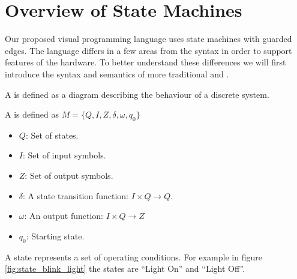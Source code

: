 \section{Overview of State Machines} \label{sec:overviewstatechart}

Our proposed visual programming language uses state machines with guarded edges. The language differs in a few areas from the  \cite{UML2} syntax in order to support features of the hardware. To better understand these differences we will first introduce the syntax and semantics of more traditional \cite{booth} and \cite{UML2}.

A \cite{booth} is defined as a diagram describing the behaviour of a discrete system.

\begin{definition}
A  is defined as $M = \lbrace Q, I, Z, \delta, \omega, q_0\rbrace$

\label{def:statecharts}
\begin{itemize}
	\item $Q$: Set of states.
	\item $I$: Set of input symbols.
	\item $Z$: Set of output symbols.
	\item $\delta$: A state transition function: $I \times Q \rightarrow Q$. 
	\item $\omega$: An output function: $I \times Q \rightarrow Z$
	\item $q_0$: Starting state.
\end{itemize}
\end{definition}

A state represents a set of operating conditions. For example in figure \ref{fig:state_blink_light} the states are ``Light On'' and ``Light Off''.

